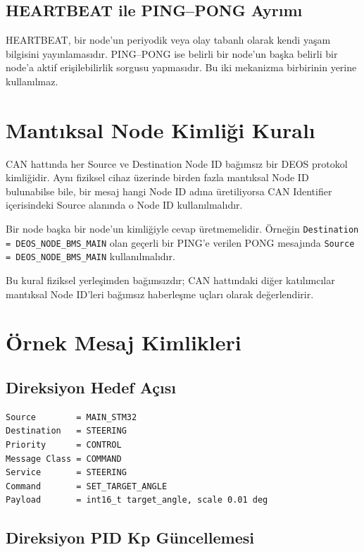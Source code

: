 \documentclass[a4paper,10pt]{article}
\newcommand{\code}[1]{\texttt{#1}}
\begin{document}
\subsection{HEARTBEAT ile PING--PONG Ayrımı}

HEARTBEAT, bir node'un periyodik veya olay tabanlı olarak kendi yaşam bilgisini yayınlamasıdır.
PING--PONG ise belirli bir node'un başka belirli bir node'a aktif erişilebilirlik sorgusu
yapmasıdır. Bu iki mekanizma birbirinin yerine kullanılmaz.

\section{Mantıksal Node Kimliği Kuralı}

CAN hattında her Source ve Destination Node ID bağımsız bir DEOS protokol kimliğidir.
Aynı fiziksel cihaz üzerinde birden fazla mantıksal Node ID bulunabilse bile, bir mesaj
hangi Node ID adına üretiliyorsa CAN Identifier içerisindeki Source alanında o Node ID
kullanılmalıdır.

Bir node başka bir node'un kimliğiyle cevap üretmemelidir. Örneğin
\code{Destination = DEOS\_NODE\_BMS\_MAIN} olan geçerli bir PING'e verilen PONG mesajında
\code{Source = DEOS\_NODE\_BMS\_MAIN} kullanılmalıdır.

Bu kural fiziksel yerleşimden bağımsızdır; CAN hattındaki diğer katılımcılar mantıksal
Node ID'leri bağımsız haberleşme uçları olarak değerlendirir.

\section{Örnek Mesaj Kimlikleri}

\subsection{Direksiyon Hedef Açısı}

\begin{verbatim}
Source        = MAIN_STM32
Destination   = STEERING
Priority      = CONTROL
Message Class = COMMAND
Service       = STEERING
Command       = SET_TARGET_ANGLE
Payload       = int16_t target_angle, scale 0.01 deg
\end{verbatim}

\subsection{Direksiyon PID Kp Güncellemesi}
\end{document}
